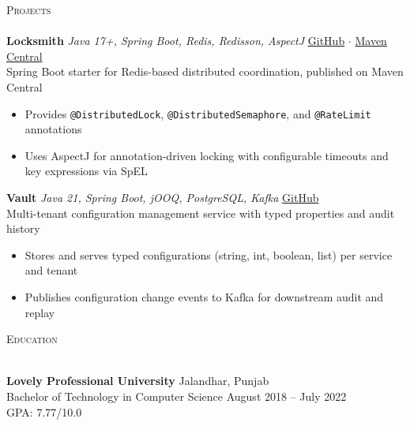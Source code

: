 \documentclass[a4paper]{article}
\newcommand{\lineunder} {
    \vspace*{-8pt} \\
    \hspace*{-18pt} \hrulefill \\
}
\newcommand{\header} [1] {
    {\hspace*{-18pt}\vspace*{6pt} \textsc{#1}}
    \vspace*{-6pt} \lineunder
}
\begin{document}
\header{Projects}
{\textbf{Locksmith}} {\sl Java 17+, Spring Boot, Redis, Redisson, AspectJ} \hfill \href{https://github.com/riido-git/locksmith}{GitHub} $\cdot$ \href{https://central.sonatype.com/artifact/in.riido/locksmith-spring-boot-starter}{Maven Central}\\
Spring Boot starter for Redis-based distributed coordination, published on Maven Central
\begin{itemize} \itemsep -2pt
    \item Provides \texttt{@DistributedLock}, \texttt{@DistributedSemaphore}, and \texttt{@RateLimit} annotations
    \item Uses AspectJ for annotation-driven locking with configurable timeouts and key expressions via SpEL
\end{itemize}
\vspace*{1mm}

{\textbf{Vault}} {\sl Java 21, Spring Boot, jOOQ, PostgreSQL, Kafka} \hfill \href{https://github.com/student-flow/vault}{GitHub}\\
Multi-tenant configuration management service with typed properties and audit history
\begin{itemize} \itemsep -2pt
    \item Stores and serves typed configurations (string, int, boolean, list) per service and tenant
    \item Publishes configuration change events to Kafka for downstream audit and replay
\end{itemize}
\vspace*{1mm}

\header{Education}
\vspace{1mm}

\textbf{Lovely Professional University} \hfill Jalandhar, Punjab\\
Bachelor of Technology in Computer Science \hfill August 2018 -- July 2022\\
GPA: 7.77/10.0\\

\
\end{document}
